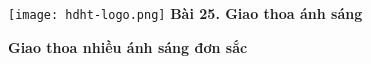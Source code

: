 \newcommand{\chapter}[2][]{
	\newcommand{\chapname}{#2}
	\begin{flushleft}
		\begin{minipage}[t]{\linewidth}
			\texttt{[image: hdht-logo.png]}
			\hspace{0pt}	
			\sffamily\bfseries\large Bài  25. Giao thoa ánh sáng
			\begin{flushleft}
				\huge\bfseries #1
			\end{flushleft}
		\end{minipage}
	\end{flushleft}
	\vspace{1cm}
	\normalfont\normalsize
}
\chapter[Giao thoa nhiều ánh sáng đơn sắc]{Giao thoa nhiều ánh sáng đơn sắc}

